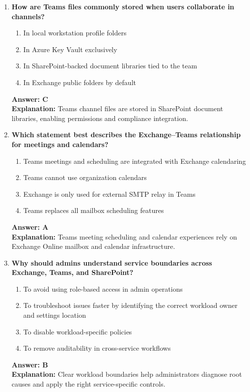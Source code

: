 \documentclass[10pt]{article}
\begin{document}
\begin{enumerate}[leftmargin=*]
\item \textbf{How are Teams files commonly stored when users collaborate in channels?}
\begin{enumerate}[label=\Alph*.]
  \item In local workstation profile folders
  \item In Azure Key Vault exclusively
  \item In SharePoint-backed document libraries tied to the team
  \item In Exchange public folders by default
\end{enumerate}
\textbf{Answer: C}\\
\textbf{Explanation:} Teams channel files are stored in SharePoint document libraries, enabling permissions and compliance integration.

\item \textbf{Which statement best describes the Exchange--Teams relationship for meetings and calendars?}
\begin{enumerate}[label=\Alph*.]
  \item Teams meetings and scheduling are integrated with Exchange calendaring
  \item Teams cannot use organization calendars
  \item Exchange is only used for external SMTP relay in Teams
  \item Teams replaces all mailbox scheduling features
\end{enumerate}
\textbf{Answer: A}\\
\textbf{Explanation:} Teams meeting scheduling and calendar experiences rely on Exchange Online mailbox and calendar infrastructure.

\item \textbf{Why should admins understand service boundaries across Exchange, Teams, and SharePoint?}
\begin{enumerate}[label=\Alph*.]
  \item To avoid using role-based access in admin operations
  \item To troubleshoot issues faster by identifying the correct workload owner and settings location
  \item To disable workload-specific policies
  \item To remove auditability in cross-service workflows
\end{enumerate}
\textbf{Answer: B}\\
\textbf{Explanation:} Clear workload boundaries help administrators diagnose root causes and apply the right service-specific controls.


\end{enumerate}
\end{document}
